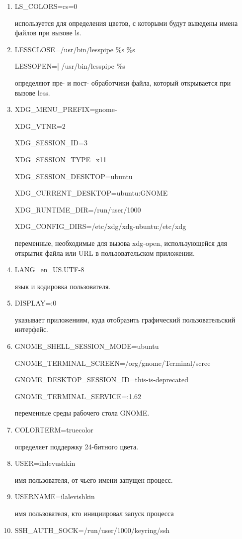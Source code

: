 \documentclass[a4paper,12pt]{article}
\begin{document}
	\begin{enumerate}
		\item LS\_COLORS=rs=0
		
		используется для определения цветов, с которыми будут выведены имена
		файлов при вызове ls.
		\item LESSCLOSE=/usr/bin/lesspipe \%s \%s
		
		LESSOPEN=| /usr/bin/lesspipe \%s
		
		определяют пре- и пост- обработчики файла, который открывается при вызове less.
		\item XDG\_MENU\_PREFIX=gnome-
		
		XDG\_VTNR=2
		
		XDG\_SESSION\_ID=3
		
		XDG\_SESSION\_TYPE=x11
		
		XDG\_SESSION\_DESKTOP=ubuntu
		
		XDG\_CURRENT\_DESKTOP=ubuntu:GNOME
		
		XDG\_RUNTIME\_DIR=/run/user/1000
		
		XDG\_CONFIG\_DIRS=/etc/xdg/xdg-ubuntu:/etc/xdg
		
		переменные, необходимые для вызова xdg-open, использующейся для
		открытия файла или URL в пользовательском приложении.
		\item LANG=en\_US.UTF-8
		
		язык и кодировка пользователя.
		\item DISPLAY=:0
		
		указывает приложениям, куда отобразить графический пользовательский
		интерфейс.
		\item GNOME\_SHELL\_SESSION\_MODE=ubuntu
		
		GNOME\_TERMINAL\_SCREEN=/org/gnome/Terminal/scree
		
		GNOME\_DESKTOP\_SESSION\_ID=this-is-deprecated
		
		GNOME\_TERMINAL\_SERVICE=:1.62
		
		переменные среды рабочего стола GNOME.
		\item COLORTERM=truecolor
		
		определяет поддержку 24-битного цвета.
		\item USER=ilalevushkin
		
		имя пользователя, от чьего имени запущен процесс.
		\item USERNAME=ilalevishkin
		
		имя пользователя, кто инициировал запуск процесса
		\item SSH\_AUTH\_SOCK=/run/user/1000/keyring/ssh
		

\end{enumerate}
\end{document}
